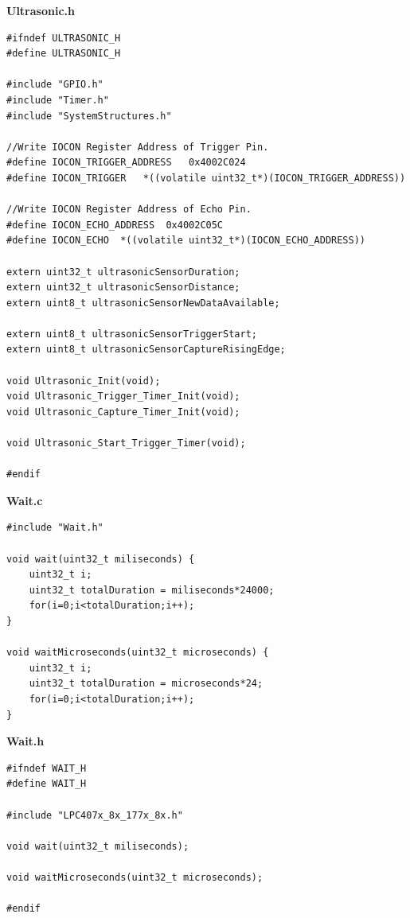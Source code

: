 \documentclass{article}
\begin{document}
\linebreak
\textbf{Ultrasonic.h}
\begin{lstlisting}
#ifndef ULTRASONIC_H
#define ULTRASONIC_H

#include "GPIO.h"
#include "Timer.h"
#include "SystemStructures.h"

//Write IOCON Register Address of Trigger Pin.
#define IOCON_TRIGGER_ADDRESS	0x4002C024
#define IOCON_TRIGGER	*((volatile uint32_t*)(IOCON_TRIGGER_ADDRESS))

//Write IOCON Register Address of Echo Pin.
#define IOCON_ECHO_ADDRESS	0x4002C05C
#define IOCON_ECHO	*((volatile uint32_t*)(IOCON_ECHO_ADDRESS))

extern uint32_t ultrasonicSensorDuration;
extern uint32_t ultrasonicSensorDistance;
extern uint8_t ultrasonicSensorNewDataAvailable;

extern uint8_t ultrasonicSensorTriggerStart;
extern uint8_t ultrasonicSensorCaptureRisingEdge;

void Ultrasonic_Init(void);
void Ultrasonic_Trigger_Timer_Init(void);
void Ultrasonic_Capture_Timer_Init(void);

void Ultrasonic_Start_Trigger_Timer(void);

#endif
\end{lstlisting}
\linebreak
\textbf{Wait.c}
\begin{lstlisting}
#include "Wait.h"

void wait(uint32_t miliseconds) {
	uint32_t i;
	uint32_t totalDuration = miliseconds*24000;
	for(i=0;i<totalDuration;i++);
}

void waitMicroseconds(uint32_t microseconds) {
	uint32_t i;
	uint32_t totalDuration = microseconds*24;
	for(i=0;i<totalDuration;i++);
}
\end{lstlisting}
\linebreak
\textbf{Wait.h}
\begin{lstlisting}
#ifndef WAIT_H
#define WAIT_H

#include "LPC407x_8x_177x_8x.h"

void wait(uint32_t miliseconds);

void waitMicroseconds(uint32_t microseconds);

#endif
\end{lstlisting}
\end{document}
